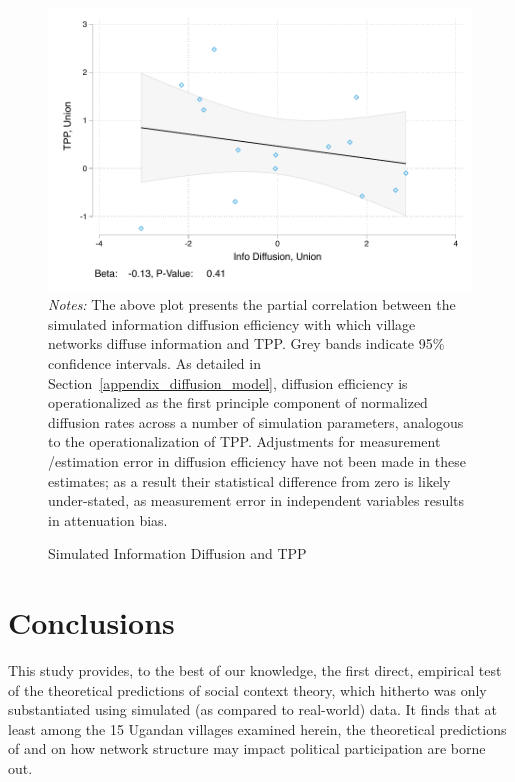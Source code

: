 \documentclass[12pt]{article}
\begin{document}
\begin{figure}[!h]
    \caption{Simulated Information Diffusion and TPP}
    \label{figure_info_diffusion_turnout}
    \includegraphics[width=\textwidth]{../3_results/info_and_tpp_scatter.pdf}
	\scriptsize{\emph{Notes:} The above plot presents the partial correlation between the simulated information diffusion efficiency with which village networks diffuse information and TPP. Grey bands indicate 95\% confidence intervals.  As detailed in Section~\ref{appendix_diffusion_model}, diffusion efficiency is operationalized as the first principle component of normalized diffusion rates across a number of simulation parameters, analogous to the operationalization of TPP. Adjustments for measurement /estimation error in diffusion efficiency have not been made in these estimates; as a result their statistical difference from zero is likely under-stated, as measurement error in independent variables results in attenuation bias.}
\end{figure}

\section{Conclusions}

This study provides, to the best of our knowledge, the first direct, empirical test of the theoretical predictions of social context theory, which hitherto was only substantiated using simulated (as compared to real-world) data. It finds that at least among the 15 Ugandan villages examined herein, the theoretical predictions of \cite{Siegel:2009vi} and \cite{Rolfe:2012ka} on how network structure may impact political participation are borne out.
\end{document}

